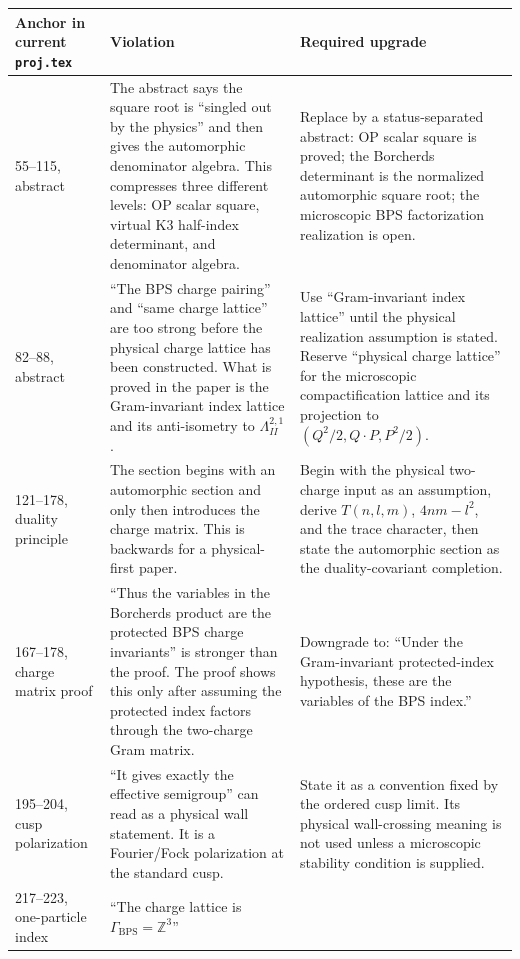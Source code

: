 \begin{center}
\small
\begin{tabular}{p{}|p{}|p{}}
\textbf{Anchor in current \texttt{proj.tex}}&
\textbf{Violation}&
\textbf{Required upgrade}\\ \hline
55--115, abstract&
The abstract says the square root is ``singled out by the physics'' and
then gives the automorphic denominator algebra.  This compresses three
different levels: OP scalar square, virtual K3 half-index determinant,
and denominator algebra.&
Replace by a status-separated abstract: OP scalar square is proved;
the Borcherds determinant is the normalized automorphic square root;
the microscopic BPS factorization realization is open.\\ \hline
82--88, abstract&
``The BPS charge pairing'' and ``same charge lattice'' are too strong
before the physical charge lattice has been constructed.  What is proved
in the paper is the Gram-invariant index lattice and its anti-isometry to
\(\Lambda^{2,1}_{II}\).&
Use ``Gram-invariant index lattice'' until the physical realization
assumption is stated.  Reserve ``physical charge lattice'' for the
microscopic compactification lattice and its projection to
\((Q^2/2,Q\cdot P,P^2/2)\).\\ \hline
121--178, duality principle&
The section begins with an automorphic section and only then introduces
the charge matrix.  This is backwards for a physical-first paper.&
Begin with the physical two-charge input as an assumption, derive
\(T(n,l,m)\), \(4nm-l^2\), and the trace character, then state the
automorphic section as the duality-covariant completion.\\ \hline
167--178, charge matrix proof&
``Thus the variables in the Borcherds product are the protected BPS
charge invariants'' is stronger than the proof.  The proof shows this
only after assuming the protected index factors through the two-charge
Gram matrix.&
Downgrade to: ``Under the Gram-invariant protected-index hypothesis,
these are the variables of the BPS index.''\\ \hline
195--204, cusp polarization&
``It gives exactly the effective semigroup'' can read as a physical
wall statement.  It is a Fourier/Fock polarization at the standard cusp.&
State it as a convention fixed by the ordered cusp limit.  Its physical
wall-crossing meaning is not used unless a microscopic stability
condition is supplied.\\ \hline
217--223, one-particle index&
``The charge lattice is \(\Gamma_{\mathrm{BPS}}=\mathbb Z^3\)''

\end{tabular}
\end{center}
